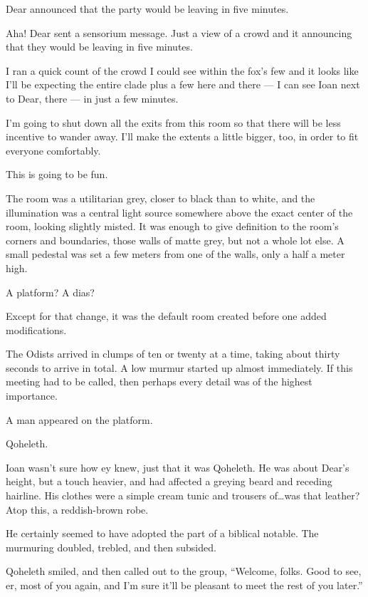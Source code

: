 Dear announced that the party would be leaving in five minutes.

\secdiv{}

\noindent Aha! Dear sent a sensorium message. Just a view of a crowd and it announcing that they would be leaving in five minutes.

I ran a quick count of the crowd I could see within the fox's few and it looks like I'll be expecting the entire clade plus a few here and there --- I can see Ioan next to Dear, there --- in just a few minutes.

I'm going to shut down all the exits from this room so that there will be less incentive to wander away. I'll make the extents a little bigger, too, in order to fit everyone comfortably.

This is going to be fun.

\secdiv{}

\noindent The room was a utilitarian grey, closer to black than to white, and the illumination was a central light source somewhere above the exact center of the room, looking slightly misted. It was enough to give definition to the room's corners and boundaries, those walls of matte grey, but not a whole lot else. A small pedestal was set a few meters from one of the walls, only a half a meter high.

A platform? A dias?

Except for that change, it was the default room created before one added modifications.

The Odists arrived in clumps of ten or twenty at a time, taking about thirty seconds to arrive in total. A low murmur started up almost immediately. If this meeting had to be called, then perhaps every detail was of the highest importance.

A man appeared on the platform.

Qoheleth.

Ioan wasn't sure how ey knew, just that it was Qoheleth. He was about Dear's height, but a touch heavier, and had affected a greying beard and receding hairline. His clothes were a simple cream tunic and trousers of\ldots{}was that leather? Atop this, a reddish-brown robe.

He certainly seemed to have adopted the part of a biblical notable. The murmuring doubled, trebled, and then subsided.

Qoheleth smiled, and then called out to the group, ``Welcome, folks. Good to see, er, most of you again, and I'm sure it'll be pleasant to meet the rest of you later.''

